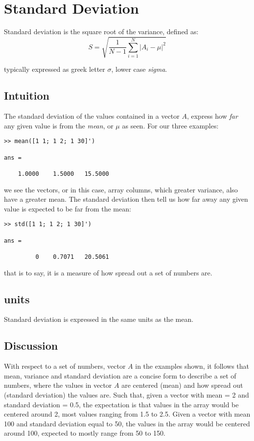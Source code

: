 \section{Standard Deviation}
Standard deviation is the square root of the variance, defined as:
\begin{equation}
S=\sqrt{\frac{1}{N-1}\sum_{i=1}^N|A_i-\mu|^2} \label{standardDeviation}    
\end{equation}


typically expressed as greek letter $\sigma$, lower case \textit{sigma}.

\subsection{Intuition}
The standard deviation of the values contained in a vector $A$, express how \textit{far} any given value is from the \textit{mean}, or $\mu$ as seen.  
For our three examples:
\begin{verbatim}
>> mean([1 1; 1 2; 1 30]')

ans =

    1.0000    1.5000   15.5000
\end{verbatim}
we see the vectors, or in this case, array columns, which greater variance, also have a greater mean. The standard deviation then tell us how far away any given value is expected to be far from the mean:
\begin{verbatim}
>> std([1 1; 1 2; 1 30]')

ans =

         0    0.7071   20.5061
\end{verbatim}
that is to say, it is a measure of how spread out a set of numbers are.

\subsection{units}
Standard deviation is expressed in the same units as the mean.

\subsection{Discussion}
With respect to a set of numbers, vector $A$ in the examples shown, it follows that mean, variance and standard deviation are a concise form to describe a set of numbers, where the values in vector $A$ are centered (mean) and how spread out (standard deviation) the values are. Such that, given a vector with mean = 2 and standard deviation = 0.5, the expectation is that values in the array would be  centered around 2, most values ranging from 1.5 to 2.5. Given a vector with mean 100 and standard deviation equal to 50, the values in the array would be centered around 100, expected to mostly range from 50 to 150.